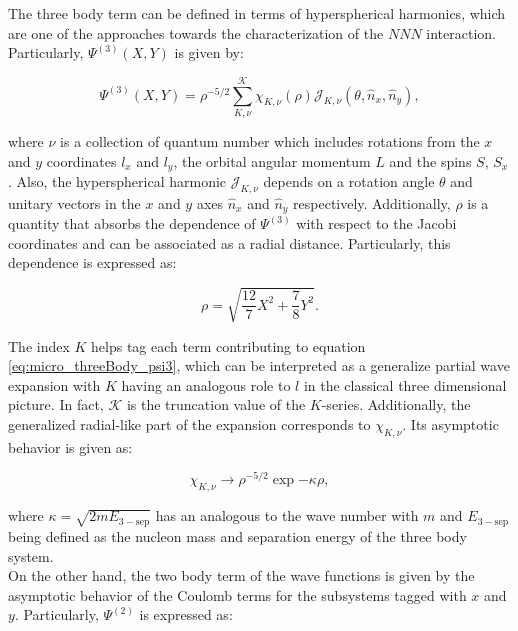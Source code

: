 \documentclass[openany]{book}
\begin{document}
The three body term can be defined in terms of hyperspherical harmonics, which are one of the approaches towards the characterization of the $NNN$ interaction. Particularly, $ \Psi^{(3)}(X, Y)$ is given by: 


\begin{equation}\label{eq:micro_threeBody_psi3}
	\Psi^{(3)}(X, Y) = \rho^{-5/2} \sum_{K, \nu}^{\mathcal{K}} {\chi_{K, \nu}(\rho) \mathcal{J}_{K, \nu} (\theta, {\hat n}_x, {\hat n}_y ) },
\end{equation}

where $\nu$ is a collection of quantum number which includes rotations from the $x$ and $y$ coordinates $l_x$ and $l_y$, the orbital angular momentum $L$ and the spins $S$, $S_x$. Also, the hyperspherical harmonic $\mathcal{J}_{K, \nu}$ depends on a rotation angle $\theta$ and unitary vectors in the $x$ and $y$ axes ${\hat n}_x$ and ${\hat n}_y$ respectively. Additionally, $\rho$ is a quantity that absorbs the dependence of $\Psi^{(3)}$  with respect to the Jacobi coordinates and can be associated as a radial distance.  Particularly, this dependence is expressed as: 

\begin{equation}\label{eq:micro_threeBody_rho}
	\rho = \sqrt{ \frac{12}{7} X^2 + \frac{7}{8} Y^2}.
\end{equation}

The index $K$ helps tag each term contributing to equation \ref{eq:micro_threeBody_psi3}, which can be interpreted as a generalize partial wave expansion with $K$ having an analogous role to $l$ in the classical three dimensional picture. In fact, $\mathcal{K}$ is the truncation value of the $K$-series. Additionally, the generalized radial-like part of the expansion corresponds to  $\chi_{K, \nu}$. Its asymptotic behavior is given as: 

\begin{equation}\label{eq:micro_threeBody_chiAsymptotics}
	\chi_{K, \nu} \rightarrow \rho^{-5/2} \exp{- \kappa \rho},
\end{equation}

where $\kappa = \sqrt{2mE_{\mathrm{3-sep}}}$ has an analogous to the wave number with $m$ and $E_{\mathrm{3-sep}}$ being defined as the nucleon mass and separation energy of the three body system. \\
	
On the other hand, the two body term of the wave functions is given by the asymptotic behavior of the Coulomb terms for the subsystems tagged with $x$ and $y$. Particularly, $\Psi^{(2)}$ is expressed as: 
\end{document}
